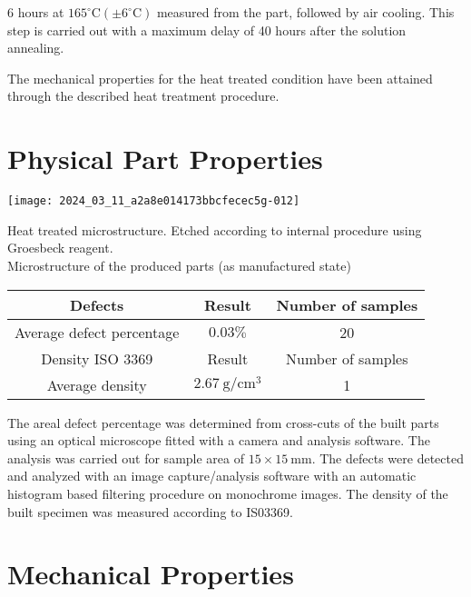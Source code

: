 \documentclass[10pt]{article}
\begin{document}
6 hours at $165^{\circ} \mathrm{C}\left( \pm 6^{\circ} \mathrm{C}\right)$ measured from the part, followed by air cooling. This step is carried out with a maximum delay of 40 hours after the solution annealing.

The mechanical properties for the heat treated condition have been attained through the described heat treatment procedure.

\section*{Physical Part Properties}
\begin{center}
\texttt{[image: 2024\_03\_11\_a2a8e014173bbcfecec5g-012]}
\end{center}

Heat treated microstructure. Etched according to internal procedure using Groesbeck reagent.\\
Microstructure of the produced parts (as manufactured state)

\begin{center}
\begin{tabular}{|c|c|c|}
\hline
Defects & Result & Number of samples \\
\hline
Average defect percentage & $0.03 \%$ & 20 \\
\hline
Density ISO 3369 & Result & Number of samples \\
\hline
Average density & $2.67 \mathrm{~g} / \mathrm{cm}^{3}$ & 1 \\
\hline
\end{tabular}
\end{center}

The areal defect percentage was determined from cross-cuts of the built parts using an optical microscope fitted with a camera and analysis software. The analysis was carried out for sample area of $15 \times 15 \mathrm{~mm}$. The defects were detected and analyzed with an image capture/analysis software with an automatic histogram based filtering procedure on monochrome images. The density of the built specimen was measured according to IS03369.

\section*{Mechanical Properties}
\end{document}
